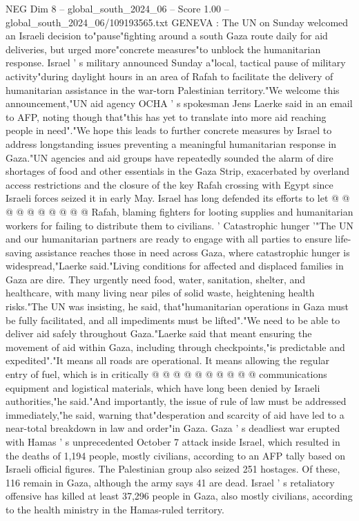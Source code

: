 \begin{textsample}{NEG Dim 8 – global\_south\_2024\_06 – Score 1.00 – global\_south\_2024\_06/109193565.txt}  \label{ex:f8_neg_247}
GENEVA : The UN on Sunday welcomed an Israeli decision to"pause"fighting around a south Gaza route daily for aid deliveries, but urged more"concrete measures"to unblock the humanitarian response.
Israel ' s military announced Sunday a"local, tactical pause of military activity"during daylight hours in an area of Rafah to facilitate the delivery of humanitarian assistance in the war-torn Palestinian territory."We welcome this announcement,"UN aid agency OCHA ' s spokesman Jens Laerke said in an email to AFP, noting though that"this has yet to translate into more aid reaching people in need"."We hope this leads to further concrete measures by Israel to address longstanding issues preventing a meaningful humanitarian response in Gaza."UN agencies and aid groups have repeatedly sounded the alarm of dire shortages of food and other essentials in the Gaza Strip, exacerbated by overland access restrictions and the closure of the key Rafah crossing with Egypt since Israeli forces seized it in early May.
Israel has long defended its efforts to let @ @ @ @ @ @ @ @ @ @ Rafah, blaming fighters for looting supplies and humanitarian workers for failing to distribute them to civilians. ' Catastrophic hunger '"The UN and our humanitarian partners are ready to engage with all parties to ensure life-saving assistance reaches those in need across Gaza, where catastrophic hunger is widespread,"Laerke said."Living conditions for affected and displaced families in Gaza are dire.
They urgently need food, water, sanitation, shelter, and healthcare, with many living near piles of solid waste, heightening health risks."The UN was insisting, he said, that"humanitarian operations in Gaza must be fully facilitated, and all impediments must be lifted"."We need to be able to deliver aid safely throughout Gaza."Laerke said that meant ensuring the movement of aid within Gaza, including through checkpoints,"is predictable and expedited"."It means all roads are operational.
It means allowing the regular entry of fuel, which is in critically @ @ @ @ @ @ @ @ @ @ communications equipment and logistical materials, which have long been denied by Israeli authorities,"he said."And importantly, the issue of rule of law must be addressed immediately,"he said, warning that"desperation and scarcity of aid have led to a near-total breakdown in law and order"in Gaza.
Gaza ' s deadliest war erupted with Hamas ' s unprecedented October 7 attack inside Israel, which resulted in the deaths of 1,194 people, mostly civilians, according to an AFP tally based on Israeli official figures.
The Palestinian group also seized 251 hostages.
Of these, 116 remain in Gaza, although the army says 41 are dead.
Israel ' s retaliatory offensive has killed at least 37,296 people in Gaza, also mostly civilians, according to the health ministry in the Hamas-ruled territory.

\end{textsample}

